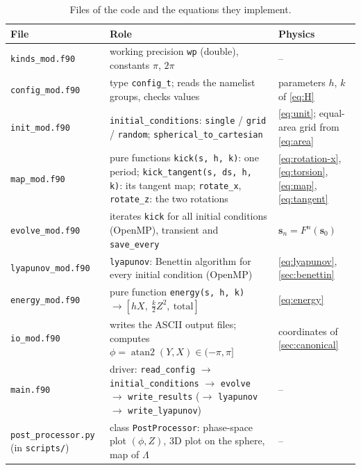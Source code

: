 \documentclass[11pt,a4paper]{article}
\newcommand{\vs}{\bm{s}}
\begin{document}
\begin{table}[!htbp]
  \centering
  \small
  \begin{tabular}{p{3.2cm}p{7.0cm}p{4.2cm}}
    \toprule
    File & Role & Physics \\
    \midrule
    \texttt{kinds\_mod.f90} & working precision \texttt{wp} (double), constants $\pi$, $2\pi$ & -- \\
    \texttt{config\_mod.f90} & type \texttt{config\_t}; reads the namelist groups, checks values & parameters $h$, $k$ of \eqref{eq:H} \\
    \texttt{init\_mod.f90} & \texttt{initial\_conditions}: \texttt{single} / \texttt{grid} / \texttt{random}; \texttt{spherical\_to\_cartesian} & \eqref{eq:unit}; equal-area grid from \eqref{eq:area} \\
    \texttt{map\_mod.f90} & pure functions \texttt{kick(s, h, k)}: one period; \texttt{kick\_tangent(s, ds, h, k)}: its
    tangent map; \texttt{rotate\_x}, \texttt{rotate\_z}: the two rotations & \eqref{eq:rotation-x}, \eqref{eq:torsion}, \eqref{eq:map}, \eqref{eq:tangent} \\
    \texttt{evolve\_mod.f90} & iterates \texttt{kick} for all initial conditions (OpenMP), transient and \texttt{save\_every} & $\vs_n = F^n(\vs_0)$ \\
    \texttt{lyapunov\_mod.f90} & \texttt{lyapunov}: Benettin algorithm for every initial condition (OpenMP) & \eqref{eq:lyapunov}, \cref{sec:benettin} \\
    \texttt{energy\_mod.f90} & pure function \texttt{energy(s, h, k)} $\to [hX,\ \frac k2 Z^2,\ \text{total}]$ & \eqref{eq:energy} \\
    \texttt{io\_mod.f90} & writes the ASCII output files; computes $\phi = \operatorname{atan2}(Y,X) \in (-\pi,\pi]$ & coordinates of \cref{sec:canonical} \\
    \texttt{main.f90} & driver: \texttt{read\_config} $\to$ \texttt{initial\_conditions} $\to$ \texttt{evolve} $\to$ \texttt{write\_results} ($\to$ \texttt{lyapunov} $\to$ \texttt{write\_lyapunov}) & -- \\
    \texttt{post\_processor.py} (in \texttt{scripts/}) & class \texttt{PostProcessor}: phase-space plot $(\phi, Z)$, 3D plot on the sphere, map of $\Lambda$ & -- \\
    \bottomrule
  \end{tabular}
  \caption{Files of the code and the equations they implement.}
  \label{tab:modules}
\end{table}
\end{document}
